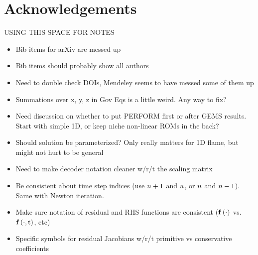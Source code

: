\chapter{Acknowledgements}

{\color{red}
USING THIS SPACE FOR NOTES
\begin{itemize}
	\item Bib items for arXiv are messed up
	\item Bib items should probably show all authors
	\item Need to double check DOIs, Mendeley seems to have messed some of them up
	\item Summations over x, y, z in Gov Eqs is a little weird. Any way to fix?
	\item Need discussion on whether to put PERFORM first or after GEMS results. Start with simple 1D, or keep niche non-linear ROMs in the back?
	\item Should solution be parameterized? Only really matters for 1D flame, but might not hurt to be general
	\item Need to make decoder notation cleaner w/r/t the scaling matrix
	\item Be consistent about time step indices (use $n + 1$ and $n$, or $n$ and $n - 1$). Same with Newton iteration.
	\item Make sure notation of residual and RHS functions are consistent ($\mathbf{f} \left(\cdot\right)$ vs. $\mathbf{f} \left(\cdot, \text{t}\right)$, etc)
	\item Specific symbols for residual Jacobians w/r/t primitive vs conservative coefficients
\end{itemize}

}